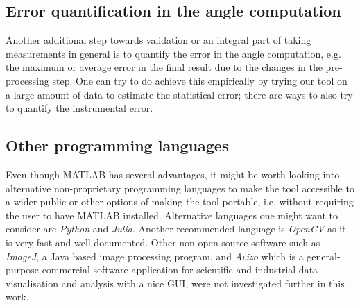 %
%




\subsection{Error quantification in the angle computation}

Another additional step towards validation or an integral part of taking measurements in general %
is to quantify the error in the angle computation, e.g. the maximum or average error in the final result due to the changes in the pre-processing step. %
One can try to do achieve this empirically by trying our tool on a large amount of data to estimate the statistical error; there are ways to also try to quantify the instrumental error. 


\subsection{Other programming languages}

Even though MATLAB has several advantages, it might be worth looking into alternative non-proprietary programming languages to make the tool accessible to a wider public or other options of making the tool portable, i.e. without requiring the user to have MATLAB installed.
Alternative languages one might want to consider are \textit{Python} and \textit{Julia}. Another recommended language is \textit{OpenCV} as it is very fast and well documented. Other non-open source software such as \textit{ImageJ}, a Java based image processing program, and \textit{Avizo} which is a general-purpose commercial software application for scientific and industrial data visualisation and analysis with a nice GUI, were not investigated further in this work. 



